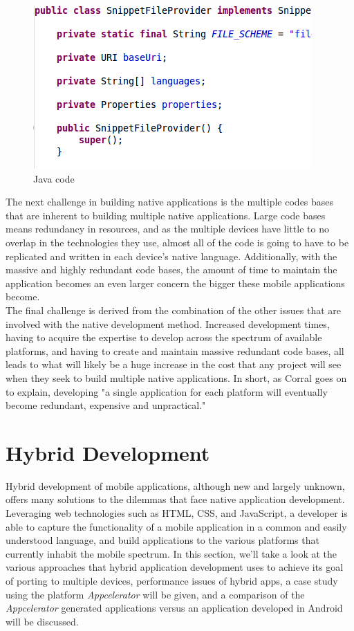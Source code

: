 \documentclass[11pt, twocolumn]{article}
\begin{document}
\begin{figure}[h!]
\includegraphics[scale=0.63]{java-code}
\caption{Java code ~\cite{Grott2009}}
\end{figure}

The next challenge in building native applications is the multiple codes bases that are inherent to building multiple native applications.  Large code bases means redundancy in resources, and as the multiple devices have little to no overlap in the technologies they use, almost all of the code is going to have to be replicated and written in each device's native language.  Additionally, with the massive and highly redundant code bases, the amount of time to maintain the application becomes an even larger concern the bigger these mobile applications become.\\

The final challenge is derived from the combination of the other issues that are involved with the native development method.  Increased development times, having to acquire the expertise to develop across the spectrum of available platforms, and having to create and maintain massive redundant code bases, all leads to what will likely be a huge increase in the cost that any project will see when they seek to build multiple native applications.  In short, as Corral goes on to explain, developing "a single application for each platform will eventually become redundant, expensive and unpractical." ~\cite{Corral2011}\\

\section{Hybrid Development}
Hybrid development of mobile applications, although new and largely unknown, offers many solutions to the dilemmas that face native application development.  Leveraging web technologies such as HTML, CSS, and JavaScript, a developer is able to capture the functionality of a mobile application in a common and easily understood language, and build applications to the various platforms that currently inhabit the mobile spectrum.  In this section, we'll take a look at the various approaches that hybrid application development uses to achieve its goal of porting to multiple devices, performance issues of hybrid apps, a case study using the platform {\it Appcelerator} will be given, and a comparison of the {\it Appcelerator} generated applications versus an application developed in Android will be discussed.\\
\end{document}

